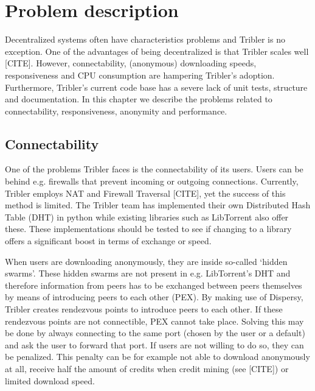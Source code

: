 \chapter{Problem description}
\label{chp:problem-description}
Decentralized systems often have characteristics problems and Tribler is no exception.
One of the advantages of being decentralized is that Tribler scales well [CITE].
However, connectability, (anonymous) downloading speeds, responsiveness and CPU consumption are hampering Tribler's adoption.
Furthermore, Tribler's current code base has a severe lack of unit tests, structure and documentation.
In this chapter we describe the problems related to connectability, responsiveness, anonymity and performance.

\section{Connectability}
One of the problems Tribler faces is the connectability of its users.
Users can be behind e.g. firewalls that prevent incoming or outgoing connections.
Currently, Tribler employs NAT and Firewall Traversal [CITE], yet the success of this method is limited.
The Tribler team has implemented their own Distributed Hash Table (DHT) in python while existing libraries such as LibTorrent also offer these.
These implementations should be tested to see if changing to a library offers a significant boost in terms of exchange or speed.

When users are downloading anonymously, they are inside so-called `hidden swarms'.
These hidden swarms are not present in e.g. LibTorrent's DHT and therefore information from peers has to be exchanged between peers themselves by means of introducing peers to each other (PEX).
By making use of Dispersy, Tribler creates rendezvous points to introduce peers to each other.
If these rendezvous points are not connectible, PEX cannot take place.
Solving this may be done by always connecting to the same port (chosen by the user or a default) and ask the user to forward that port.
If users are not willing to do so, they can be penalized.
This penalty can be for example not able to download anonymously at all, receive half the amount of credits when credit mining (see [CITE]) or limited download speed.


